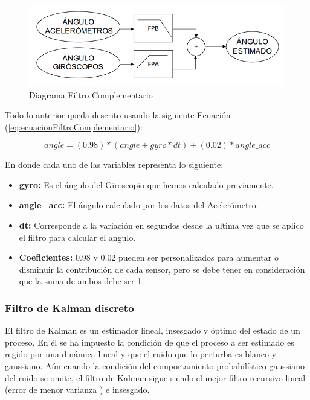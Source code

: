 \documentclass[12pt,a4paper]{article}
\begin{document}
			\begin{figure}[H]
				\centering
				\includegraphics[scale=0.5]{images/FiltroComplementario}
				\caption{Diagrama Filtro Complementario}
				\label{fig:diagramafiltrocomplementario}
			\end{figure}
			
			Todo lo anterior queda descrito usando la siguiente Ecuación (\ref{eq:ecuacionFiltroComplementario}):
			
			\begin{equation}
				\label{eq:ecuacionFiltroComplementario}
				angle = (0.98)*(angle+gyro*dt)+(0.02)*angle\_acc
			\end{equation}
			
			En donde cada uno de las variables representa lo siguiente:
			\begin{itemize}
				\item \textbf{gyro:} Es el ángulo del Giroscopio que hemos calculado previamente.
				\item \textbf{angle\_acc:} El ángulo calculado por los datos del Acelerómetro.
				\item \textbf{dt:} Corresponde a la variación en segundos desde la ultima vez que se aplico el filtro para calcular el angulo.
				\item \textbf{Coeficientes:}  0.98 y 0.02 pueden ser personalizados para aumentar o disminuir la contribución de cada sensor, pero se debe tener en consideración que la suma de ambos debe ser 1.
			\end{itemize}
			
			\subsubsection{Filtro de Kalman discreto}
			El filtro de Kalman \cite{KALMANDF} es un estimador lineal, insesgado y óptimo del estado de un proceso. En él se ha impuesto la condición de que el proceso a ser estimado es regido por una dinámica lineal y que el ruido que lo perturba es blanco y gaussiano. Aún cuando la condición del comportamiento probabilístico gaussiano del ruido se omite, el filtro de Kalman sigue siendo el mejor filtro recursivo lineal (error de menor varianza ) e insesgado.
			
\end{document}
